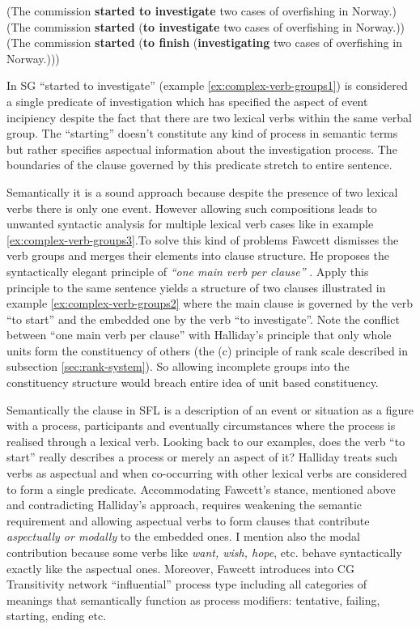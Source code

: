 \begin{exe}
	\ex\label{ex:complex-verb-groups1}
	(The commission \textbf{started to investigate} two cases of overfishing in Norway.)  
	\ex\label{ex:complex-verb-groups2}
	(The commission \textbf{started} (\textbf{to investigate} two cases of overfishing in Norway.))
	\ex\label{ex:complex-verb-groups3}
	(The commission \textbf{started} (\textbf{to finish} (\textbf{investigating} two cases of overfishing in Norway.)))
\end{exe}

In SG ``started to investigate'' (example \ref{ex:complex-verb-groups1}) is considered a single predicate of investigation which has specified the aspect of event incipiency despite the fact that there are two lexical verbs within the same verbal group. The ``starting'' doesn't constitute any kind of process in semantic terms but rather specifies aspectual information about the investigation process. The boundaries of the clause governed by this predicate stretch to entire sentence.

Semantically it is a sound approach because despite the presence of two lexical verbs there is only one event. However allowing such compositions leads to unwanted syntactic analysis for multiple lexical verb cases like in example \ref{ex:complex-verb-groups3}.To solve this kind of problems Fawcett dismisses the verb groups and merges their elements into clause structure. He proposes the syntactically elegant principle of \textit{``one main verb per clause''} \citep{Fawcett2008}. Apply this principle to the same sentence yields a structure of two clauses illustrated in example \ref{ex:complex-verb-groups2} where the main clause is governed by the verb ``to start'' and the embedded one by the verb ``to investigate''. Note the conflict between ``one main verb per clause'' with Halliday's principle that only whole units form the constituency of others (the (c) principle of rank scale described in subsection \ref{sec:rank-system}). So allowing incomplete groups into the constituency structure would breach entire idea of unit based constituency. 

Semantically the clause in SFL is a description of an event or situation as a figure with a process, participants and eventually circumstances where the process is realised through a lexical verb. Looking back to our examples, does the verb ``to start'' really describes a process or merely an aspect of it? Halliday treats such verbs as aspectual and when co-occurring with other lexical verbs are considered to form a single predicate. Accommodating Fawcett's stance, mentioned above and contradicting Halliday's approach, requires weakening the semantic requirement and allowing aspectual verbs to form clauses that contribute \textit{aspectually or modally} to the embedded ones. I mention also the modal contribution because some verbs like \textit{want, wish, hope}, etc. behave syntactically exactly like the aspectual ones. Moreover, Fawcett introduces into CG Transitivity network ``influential'' process type including all categories of meanings that semantically function as process modifiers: tentative, failing, starting, ending etc.

